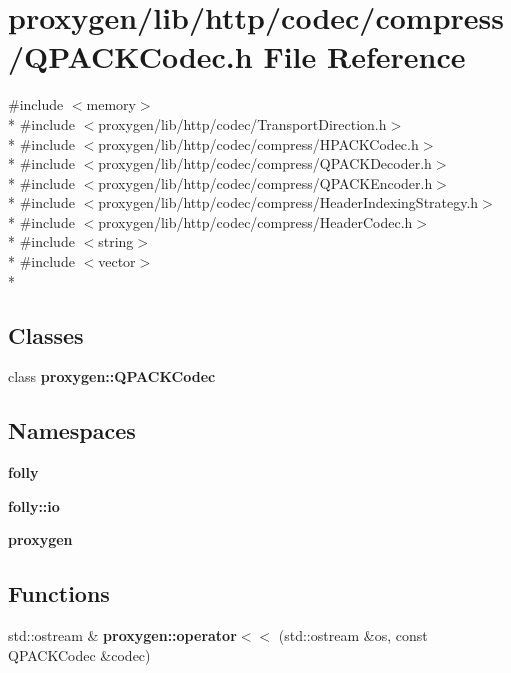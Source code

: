 \section{proxygen/lib/http/codec/compress/\+Q\+P\+A\+C\+K\+Codec.h File Reference}
\label{QPACKCodec_8h}
{\ttfamily \#include $<$memory$>$}\\*
{\ttfamily \#include $<$proxygen/lib/http/codec/\+Transport\+Direction.\+h$>$}\\*
{\ttfamily \#include $<$proxygen/lib/http/codec/compress/\+H\+P\+A\+C\+K\+Codec.\+h$>$}\\*
{\ttfamily \#include $<$proxygen/lib/http/codec/compress/\+Q\+P\+A\+C\+K\+Decoder.\+h$>$}\\*
{\ttfamily \#include $<$proxygen/lib/http/codec/compress/\+Q\+P\+A\+C\+K\+Encoder.\+h$>$}\\*
{\ttfamily \#include $<$proxygen/lib/http/codec/compress/\+Header\+Indexing\+Strategy.\+h$>$}\\*
{\ttfamily \#include $<$proxygen/lib/http/codec/compress/\+Header\+Codec.\+h$>$}\\*
{\ttfamily \#include $<$string$>$}\\*
{\ttfamily \#include $<$vector$>$}\\*
\subsection*{Classes}
\begin{DoxyCompactItemize}
\item 
class {\bf proxygen\+::\+Q\+P\+A\+C\+K\+Codec}
\end{DoxyCompactItemize}
\subsection*{Namespaces}
\begin{DoxyCompactItemize}
\item 
 {\bf folly}
\item 
 {\bf folly\+::io}
\item 
 {\bf proxygen}
\end{DoxyCompactItemize}
\subsection*{Functions}
\begin{DoxyCompactItemize}
\item 
std\+::ostream \& {\bf proxygen\+::operator$<$$<$} (std\+::ostream \&os, const Q\+P\+A\+C\+K\+Codec \&codec)
\end{DoxyCompactItemize}
